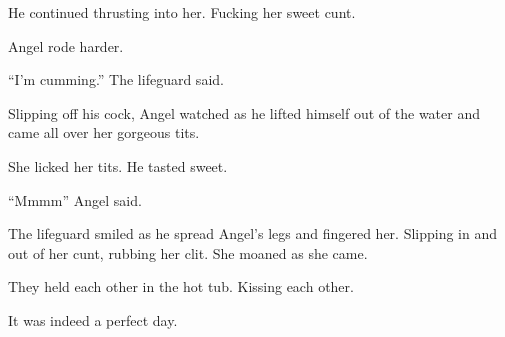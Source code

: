     He continued thrusting into her. Fucking her sweet cunt.

    Angel rode harder.

    “I’m cumming.” The lifeguard said.

    Slipping off his cock, Angel watched as he lifted himself out of the water and came all over her gorgeous tits.

    She licked her tits. He tasted sweet.

    “Mmmm” Angel said.

    The lifeguard smiled as he spread Angel’s legs and fingered her. Slipping in and out of her cunt, rubbing her clit. She moaned as she came.

    They held each other in the hot tub. Kissing each other.

    It was indeed a perfect day.

